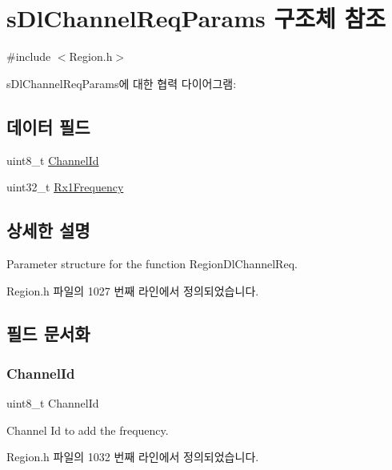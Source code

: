 \hypertarget{structs_dl_channel_req_params}{}\section{s\+Dl\+Channel\+Req\+Params 구조체 참조}
\label{structs_dl_channel_req_params}


{\ttfamily \#include $<$Region.\+h$>$}



s\+Dl\+Channel\+Req\+Params에 대한 협력 다이어그램\+:
\subsection*{데이터 필드}
\begin{DoxyCompactItemize}
\item 
uint8\+\_\+t \mbox{\hyperlink{structs_dl_channel_req_params_ae23f953dc29c360e56a3c856404a3276}{Channel\+Id}}
\item 
uint32\+\_\+t \mbox{\hyperlink{structs_dl_channel_req_params_a8a564b8635b12d5f0f348ae177dd92e1}{Rx1\+Frequency}}
\end{DoxyCompactItemize}


\subsection{상세한 설명}
Parameter structure for the function Region\+Dl\+Channel\+Req. 

Region.\+h 파일의 1027 번째 라인에서 정의되었습니다.



\subsection{필드 문서화}
\mbox{\label{structs_dl_channel_req_params_ae23f953dc29c360e56a3c856404a3276}} 
\subsubsection{\texorpdfstring{Channel\+Id}{ChannelId}}
{\footnotesize\ttfamily uint8\+\_\+t Channel\+Id}

Channel Id to add the frequency. 

Region.\+h 파일의 1032 번째 라인에서 정의되었습니다.


